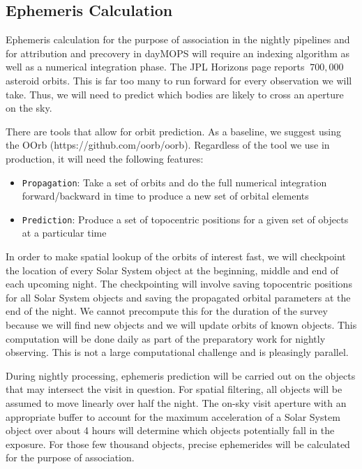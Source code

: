 \subsection{Ephemeris Calculation}
\label{sec:acEphemerisCalculation}
Ephemeris calculation for the purpose of association in the nightly pipelines and for attribution and precovery in dayMOPS will require an indexing algorithm as well as a numerical integration phase. The JPL Horizons page reports $~700,000$ asteroid orbits.  This is far too many to run forward for every observation we will take.  Thus, we will need to predict which bodies are likely to cross an aperture on the sky.

There are tools that allow for orbit prediction.  As a baseline, we suggest using the OOrb (https://github.com/oorb/oorb).  Regardless of the tool we use in production, it will need the following features:
\begin{itemize}
\item \texttt{Propagation}: Take a set of orbits and do the full numerical integration forward/backward in time to produce a new set of orbital elements
\item \texttt{Prediction}: Produce a set of topocentric positions for a given set of objects at a particular time
\end{itemize}

In order to make spatial lookup of the orbits of interest fast, we will checkpoint the location of every Solar System object at the beginning, middle and end of each upcoming night.  The checkpointing will involve saving topocentric positions for all Solar System objects and saving the propagated orbital parameters at the end of the night.  We cannot precompute this for the duration of the survey because we will find new objects and we will update orbits of known objects.  This computation will be done daily as part of the preparatory work for nightly observing.  This is not a large computational challenge and is pleasingly parallel.

During nightly processing, ephemeris prediction will be carried out on the objects that may intersect the visit in question.  For spatial filtering, all objects will be assumed to move linearly over half the night.  The on-sky visit aperture with an appropriate buffer to account for the maximum acceleration of a Solar System object over about 4 hours will determine which objects potentially fall in the exposure.  For those few thousand objects, precise ephemerides will be calculated for the purpose of association.

